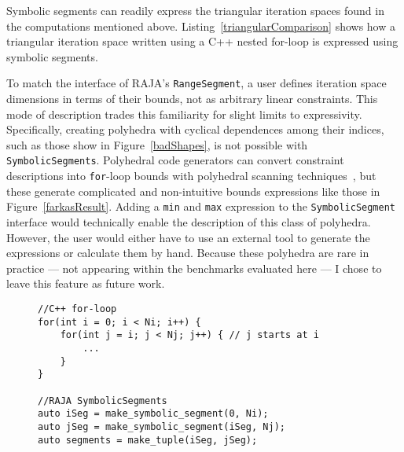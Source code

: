 Symbolic segments can readily express the triangular iteration spaces found in the computations mentioned above. 
Listing~\ref{triangularComparison} shows how a triangular iteration space written using a C++ nested for-loop is expressed using symbolic segments.

To match the interface of RAJA's \verb.RangeSegment., a user defines iteration space dimensions in terms of their bounds, not as arbitrary linear constraints.
This mode of description trades this familiarity for slight limits to expressivity.
Specifically, creating polyhedra with cyclical dependences among their indices, such as those show in Figure~\ref{badShapes}, is not possible with \verb.SymbolicSegments.. 
Polyhedral code generators can convert constraint descriptions into \verb.for.-loop bounds with polyhedral scanning techniques~\cite{pouchet2007iterative,grosser2011polly, benabderrahmane2010polyhedral}, but these generate complicated and non-intuitive bounds expressions like those in Figure~\ref{farkasResult}. 
Adding a \verb.min. and \verb.max. expression to the \verb.SymbolicSegment. interface would technically enable the description of this class of polyhedra.
However, the user would either have to use an external tool to generate the expressions or calculate them by hand.
Because these polyhedra are rare in practice --- not appearing within the benchmarks evaluated here --- I chose to leave this feature as future work.


\begin{figure}
\begin{lstlisting}[caption={Comparison of C++ for-loop and RAJA \texttt{SymbolicSegment} representations of a loop nest with a triangular iteration space.},label=triangularComparison]
//C++ for-loop
for(int i = 0; i < Ni; i++) {
	for(int j = i; j < Nj; j++) { // j starts at i
		... 
	}
}

//RAJA SymbolicSegments
auto iSeg = make_symbolic_segment(0, Ni);
auto jSeg = make_symbolic_segment(iSeg, Nj);
auto segments = make_tuple(iSeg, jSeg);
\end{lstlisting}
\end{figure}






